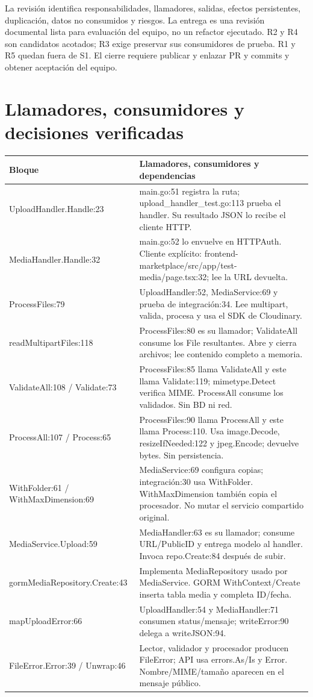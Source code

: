 \documentclass[11pt,a4paper]{article}
\begin{document}
La revisión identifica responsabilidades, llamadores, salidas, efectos persistentes, duplicación, datos no consumidos y riesgos. La entrega es una revisión documental lista para evaluación del equipo, no un refactor ejecutado. R2 y R4 son candidatos acotados; R3 exige preservar sus consumidores de prueba. R1 y R5 quedan fuera de S1. El cierre requiere publicar y enlazar PR y commits y obtener aceptación del equipo.


\section{Llamadores, consumidores y decisiones verificadas}
\begin{longtable}{>{\raggedright\arraybackslash}p{}>{\raggedright\arraybackslash}p{}}
\toprule
Bloque & Llamadores, consumidores y dependencias\\ \midrule
UploadHandler.Handle:23 & main.go:51 registra la ruta; upload\_handler\_test.go:113 prueba el handler. Su resultado JSON lo recibe el cliente HTTP.\\
MediaHandler.Handle:32 & main.go:52 lo envuelve en HTTPAuth. Cliente explícito: frontend-marketplace/src/app/test-media/page.tsx:32; lee la URL devuelta.\\
ProcessFiles:79 & UploadHandler:52, MediaService:69 y prueba de integración:34. Lee multipart, valida, procesa y usa el SDK de Cloudinary.\\
readMultipartFiles:118 & ProcessFiles:80 es su llamador; ValidateAll consume los File resultantes. Abre y cierra archivos; lee contenido completo a memoria.\\
ValidateAll:108 / Validate:73 & ProcessFiles:85 llama ValidateAll y este llama Validate:119; mimetype.Detect verifica MIME. ProcessAll consume los validados. Sin BD ni red.\\
ProcessAll:107 / Process:65 & ProcessFiles:90 llama ProcessAll y este llama Process:110. Usa image.Decode, resizeIfNeeded:122 y jpeg.Encode; devuelve bytes. Sin persistencia.\\
WithFolder:61 / WithMaxDimension:69 & MediaService:69 configura copias; integración:30 usa WithFolder. WithMaxDimension también copia el procesador. No mutar el servicio compartido original.\\
MediaService.Upload:59 & MediaHandler:63 es su llamador; consume URL/PublicID y entrega modelo al handler. Invoca repo.Create:84 después de subir.\\
gormMediaRepository.Create:43 & Implementa MediaRepository usado por MediaService. GORM WithContext/Create inserta tabla media y completa ID/fecha.\\
mapUploadError:66 & UploadHandler:54 y MediaHandler:71 consumen status/mensaje; writeError:90 delega a writeJSON:94.\\
FileError.Error:39 / Unwrap:46 & Lector, validador y procesador producen FileError; API usa errors.As/Is y Error. Nombre/MIME/tamaño aparecen en el mensaje público.\\
\bottomrule
\end{longtable}
\end{document}
